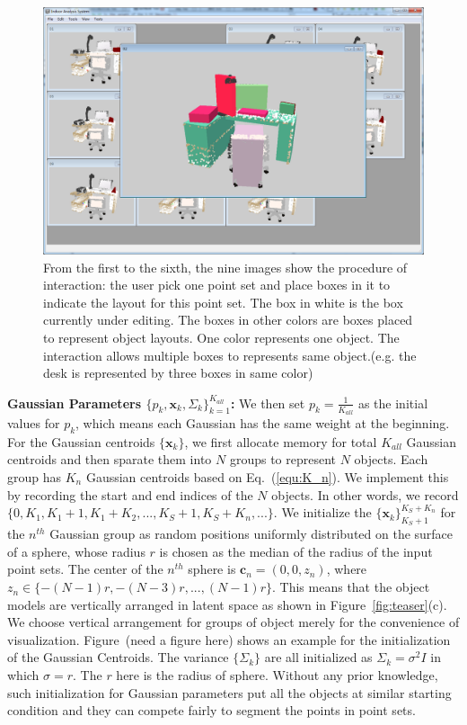 \begin{figure}[htb]
	\includegraphics[width=.3\linewidth]{images/interact06.png}
	\caption{\label{fig:interact}
		From the first to the sixth, the nine images show the procedure of interaction:
		the user pick one point set and place boxes in it to indicate the layout for this point set. The box in white is the box currently under editing. The boxes in other colors are boxes placed to represent object layouts. One color represents one object. The interaction allows multiple boxes to represents same object.(e.g. the desk is represented by three boxes in same color)}
\end{figure}

\noindent\textbf{Gaussian Parameters $\{p_k,\mathbf{x}_k,\Sigma_k\}_{k=1}^{K_{all}}$:}
We then set $p_k=\frac{1}{K_{all}}$ as the initial values for $p_k$, which means each Gaussian has the same weight at the beginning. For the Gaussian centroids $\{\mathbf{x}_k\}$, we first allocate memory for total $K_{all}$ Gaussian centroids and then sparate them into $N$ groups to represent $N$ objects. Each group has $K_n$ Gaussian centroids based on Eq.~(\ref{equ:K_n}). We implement this by recording the start and end indices of the $N$ objects. In other words, we record $\{0,K_1,K_1+1,K_1+K_2,...,K_S+1,K_S+K_n,...\}$. We initialize the $\{\mathbf{x}_k\}_{K_S+1}^{K_S+K_n}$ for the $n^{th}$ Gaussian group as random positions uniformly distributed on the surface of a sphere, whose radius $r$ is chosen as the median of the radius of the input point sets. 
%
The center of the $n^{th}$ sphere is $\mathbf{c}_n=(0,0,z_n)$, where $z_n\in \{-(N-1)r,-(N-3)r,...,(N-1)r\}$.
%
This means that the object models are vertically arranged in latent space as shown in Figure~\ref{fig:teaser}(c). 
We choose vertical arrangement for groups of object merely for the convenience of visualization.
Figure~(need a figure here) shows an example for the initialization of the Gaussian Centroids.
The variance $\{\Sigma_k\}$ are all initialized as $\Sigma_k=\sigma^2 I$ in which $\sigma=r$.
The $r$ here is the radius of sphere. Without any prior knowledge, such initialization for Gaussian parameters put all the objects at similar starting condition and they can compete fairly to segment the points in point sets.   


